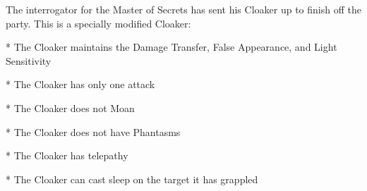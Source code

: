 The interrogator for the Master of Secrets has sent his Cloaker up to finish off the party.
This is a specially modified Cloaker:

* The Cloaker maintains the Damage Transfer, False Appearance, and Light Sensitivity

* The Cloaker has only one attack

* The Cloaker does not Moan

* The Cloaker does not have Phantasms

* The Cloaker has telepathy

* The Cloaker can cast sleep on the target it has grappled
